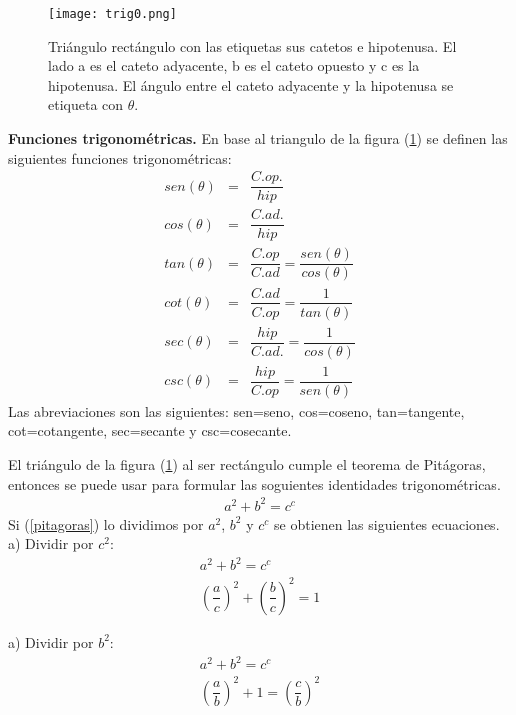 \begin{center}
\begin{figure}[h!]
\centering
\texttt{[image: trig0.png]}
\caption[Triangulo rectángulo con las etiquetas sus catetos e hipotenusa]{Triángulo rectángulo con las etiquetas sus catetos e hipotenusa. El lado a es el cateto adyacente, b es el cateto opuesto y c es la hipotenusa. El ángulo entre el cateto adyacente y la hipotenusa se etiqueta con $\theta$. } \label{trig0}
\end{figure}
\end{center}

\begin{mydef}
\textbf{Funciones trigonométricas. }En base al triangulo de la figura (\ref{trig0}) se definen las siguientes funciones trigonométricas:
\begin{eqnarray}
sen(\theta)&=&\dfrac{C. op.}{hip}\\
cos(\theta)&=&\dfrac{C. ad.}{hip}\\
tan(\theta)&=&\dfrac{C. op}{C. ad}=\dfrac{sen(\theta)}{cos(\theta)}\\
cot(\theta)&=&\dfrac{C. ad}{C. op}=\dfrac{1}{tan(\theta)}\\
sec(\theta)&=&\dfrac{hip}{C. ad.}=\dfrac{1}{cos(\theta)}\\
csc(\theta)&=&\dfrac{hip}{C. op}=\dfrac{1}{sen(\theta)}
\end{eqnarray}
Las abreviaciones son las siguientes: sen=seno, cos=coseno, tan=tangente, cot=cotangente, sec=secante y csc=cosecante.
\end{mydef}

El triángulo de la figura (\ref{trig0}) al ser rectángulo cumple el teorema de Pitágoras, entonces se puede usar para formular las soguientes identidades trigonométricas. 
\begin{eqnarray}
a^{2}+b^{2}=c^{c}
\label{pitagoras}
\end{eqnarray} 
Si (\ref{pitagoras}) lo dividimos por $a^{2}$, $b^{2}$ y $c^{c}$ se obtienen las siguientes ecuaciones.\\

\noindent a) Dividir por $c^{2}:$
\begin{eqnarray}
a^{2}+b^{2}=c^{c} \\
\left(\dfrac{a}{c}\right)^{2}+\left(\dfrac{b}{c}\right)^{2}=1
\end{eqnarray}

\noindent a) Dividir por $b^{2}:$
\begin{eqnarray}
a^{2}+b^{2}=c^{c} \\
\left(\dfrac{a}{b}\right)^{2}+1=\left(\dfrac{c}{b}\right)^{2}
\end{eqnarray}


